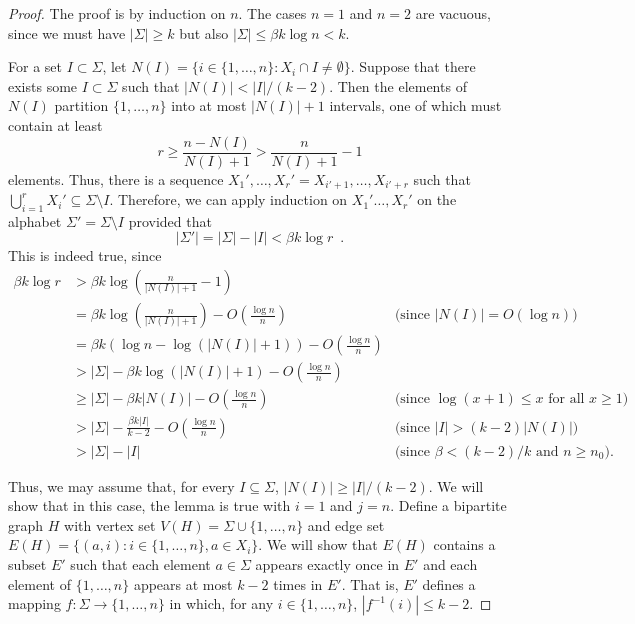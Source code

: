 \documentclass{patmorin}
\begin{document}
\begin{proof}
   The proof is by induction on $n$.  The cases $n=1$ and $n=2$ are vacuous, 
   since we must have $|\Sigma|\ge k$ but also $|\Sigma|\le \beta k\log n < k$.

   For a set $I\subset\Sigma$, let $N(I)=\{i\in\{1,\ldots,n\}: X_i\cap
   I\neq\emptyset\}$.  Suppose that there exists some $I\subset\Sigma$ 
   such that $|N(I)| < |I|/(k-2)$.  Then the elements of $N(I)$ partition
   $\{1,\ldots,n\}$ into at most $|N(I)|+1$ intervals, one of which must
   contain at least
   \[
       r \ge \frac{n-N(I)}{N(I)+1} > \frac{n}{N(I)+1}-1 
   \]
   elements. Thus, there is a sequence
   $X_1',\ldots,X_r'=X_{i'+1},\ldots,X_{i'+r}$  such that
   $\bigcup_{i=1}^r X_i' \subseteq \Sigma\setminus I$.  Therefore, we can apply
   induction on $X_1'\ldots,X_r'$ on the alphabet $\Sigma'=\Sigma\setminus
   I$ provided that
   \[
         |\Sigma'| = |\Sigma|-|I| < \beta k\log r \enspace .
   \]
   This is indeed true, since
   \begin{align*}
      \beta k\log r 
             & > \beta k\log\left(\frac{n}{|N(I)|+1}-1\right) \\
             & = \beta k\log\left(\frac{n}{|N(I)|+1}\right) 
               - O\left(\frac{\log n}{n}\right)  
               & \text{(since $|N(I)|=O(\log n)$)} \\
             & = \beta k\left(\log n - \log (|N(I)|+1)\right)
                  - O\left(\frac{\log n}{n}\right)    \\
             & > |\Sigma| - \beta k\log (|N(I)|+1) 
                  - O\left(\frac{\log n}{n}\right) \\
             & \ge |\Sigma| - \beta k|N(I)| - O\left(\frac{\log n}{n}\right) 
                & \text{(since $\log(x+1) \le x$ for all $x\ge 1$)} \\
             & > |\Sigma| - \frac{\beta k|I|}{k-2}- O\left(\frac{\log n}{n}\right) 
                & \text{(since $|I|>(k-2)|N(I)|$)}  \\
             & > |\Sigma| - |I| 
                & \text{(since $\beta < (k-2)/k$ and $n\ge n_0$).} 
   \end{align*}

   Thus, we may assume that, for every $I\subseteq\Sigma$,  $|N(I)|\ge
   |I|/(k-2)$.  We will show that in this case, the lemma is true
   with $i=1$ and $j=n$.  Define a bipartite graph $H$ with vertex
   set $V(H)=\Sigma\cup\{1,\ldots,n\}$ and edge set $E(H)=\{(a,i):
   i\in\{1,\ldots,n\}, a\in X_i\}$.  We will show that $E(H)$ contains a
   subset $E'$ such that each element $a\in\Sigma$ appears exactly once in
   $E'$ and each element of $\{1,\ldots,n\}$ appears at most $k-2$ times
   in $E'$.  That is, $E'$ defines a mapping $f:\Sigma\to\{1,\ldots,n\}$
   in which, for any $i\in\{1,\ldots,n\}$, $|f^{-1}(i)|\le k-2$.


\end{proof}
\end{document}
